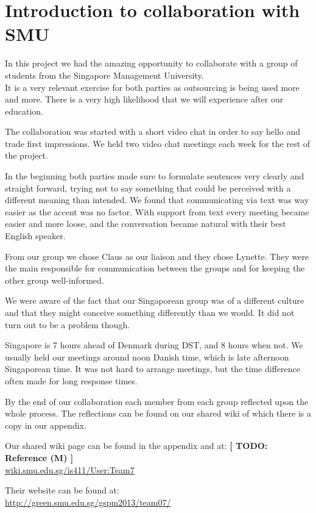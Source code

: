 \section{Introduction to collaboration with SMU}
In this project we had the amazing opportunity to collaborate with a group of students from the Singapore Management University.
\\It is a very relevant exercise for both parties as outsourcing is being used more and more. There is a very high likelihood that we will experience after our education.

The collaboration was started with a short video chat in order to say hello and trade first impressions. We held two video chat meetings each week for the rest of the project.

In the beginning both parties made sure to formulate sentences very clearly and straight forward, trying not to say something that could be perceived with a different meaning than intended. We found that communicating via text was way easier as the accent was no factor.
With support from text every meeting became easier and more loose, and the conversation became natural with their best English speaker.

From our group we chose Claus as our liaison and they chose Lynette. They were the main responsible for communication between the groups and for keeping the other group well-informed.

We were aware of the fact that our Singaporean group was of a different culture and that they might conceive something differently than we would. It did not turn out to be a problem though.

Singapore is 7 hours ahead of Denmark during DST, and 8 hours when not. We usually held our meetings around noon Danish time, which is late afternoon Singaporean time. It was not hard to arrange meetings, but the time difference often made for long response times.

By the end of our collaboration each member from each group reflected upon the whole process. The reflections can be found on our shared wiki of which there is a copy in our appendix.

Our shared wiki page can be found in the appendix and at: \textbf{[ TODO: Reference (M) ]}
\\\url{wiki.smu.edu.sg/is411/User:Team7}

Their website can be found at:
\\\url{http://green.smu.edu.sg/gspm2013/team07/}
\newpage